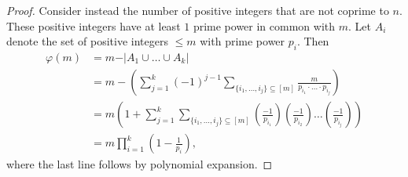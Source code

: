 \begin{proof}
    Consider instead the number of positive integers that are not coprime to $n$. These positive integers have at least $1$ prime power in common with $m$. Let $A_{i}$ denote the set of positive integers $\leq m$ with prime power $p_i$. Then 
    \begin{align*}
        \varphi(m) &= m - \vert A_{1}\cup \hdots \cup A_{k}\vert \\
        &= m - \left(\sum_{j=1}^k (-1)^{j-1} \sum_{\{i_1, \hdots, i_j\}\subseteq [m]}\frac{m}{p_{i_1}\cdot \hdots \cdot p_{i_j}}\right) \\ 
        &= m\left(1 + \sum_{j=1}^k \sum_{\{i_1, \hdots, i_j\}\subseteq [m]}\left(\frac{-1}{p_{i_1}}\right)\left(\frac{-1}{p_{i_2}}\right)\hdots \left(\frac{-1}{p_{i_j}}\right)\right) \\ 
        &= m\prod_{i=1}^k \left(1 - \frac{1}{p_i}\right),
    \end{align*}
    where the last line follows by polynomial expansion.
\end{proof}







